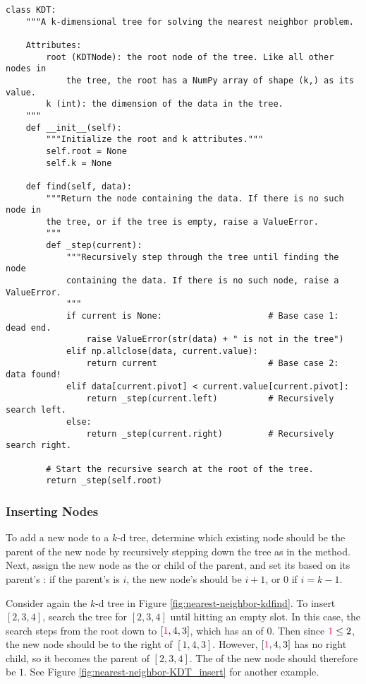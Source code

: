 \begin{lstlisting}
class KDT:
    """A k-dimensional tree for solving the nearest neighbor problem.

    Attributes:
        root (KDTNode): the root node of the tree. Like all other nodes in
            the tree, the root has a NumPy array of shape (k,) as its value.
        k (int): the dimension of the data in the tree.
    """
    def __init__(self):
        """Initialize the root and k attributes."""
        self.root = None
        self.k = None

    def find(self, data):
        """Return the node containing the data. If there is no such node in
        the tree, or if the tree is empty, raise a ValueError.
        """
        def _step(current):
            """Recursively step through the tree until finding the node
            containing the data. If there is no such node, raise a ValueError.
            """
            if current is None:                     # Base case 1: dead end.
                raise ValueError(str(data) + " is not in the tree")
            elif np.allclose(data, current.value):
                return current                      # Base case 2: data found!
            elif data[current.pivot] < current.value[current.pivot]:
                return _step(current.left)          # Recursively search left.
            else:
                return _step(current.right)         # Recursively search right.

        # Start the recursive search at the root of the tree.
        return _step(self.root)
\end{lstlisting}

\subsubsection*{Inserting Nodes} %

To add a new node to a $k$-d tree, determine which existing node should be the parent of the new node by recursively stepping down the tree as in the  method.
Next, assign the new node as the  or  child of the parent, and set its  based on its parent's : if the parent's  is $i$, the new node's  should be $i+1$, or $0$ if $i = k-1$.

Consider again the $k$-d tree in Figure \ref{fig:nearest-neighbor-kdfind}.
To insert $[2,3,4]$, search the tree for $[2,3,4]$ until hitting an empty slot.
In this case, the search steps from the root down to $[\textcolor{red}{1},4,3]$, which has an  of $0$.
Then since $\textcolor{red}{1} \le 2$, the new node should be to the right of $[1,4,3]$.
However, $[\textcolor{red}{1},4,3]$ has no right child, so it becomes the parent of $[2,3,4]$.
The  of the new node should therefore be $1$.
See Figure \ref{fig:nearest-neighbor-KDT_insert} for another example.

